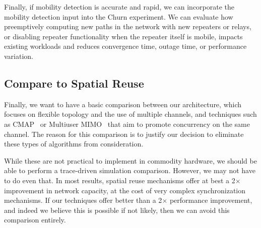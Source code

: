  Finally, if mobility detection is accurate and rapid, we can incorporate the mobility detection input into the Churn experiment. We can evaluate how preemptively computing new paths in the network with new repeaters or relays, or disabling repeater functionality when the repeater itself is mobile, impacts existing workloads and reduces convergence time, outage time, or performance variation.


\subsection{Compare to Spatial Reuse}
Finally, we want to have a basic comparison between our architecture, which focuses on flexible topology and the use of multiple channels, and techniques such as CMAP~\cite{vutukuru_cmap} or Multiuser MIMO~\cite{heath_mumimo,spencer_mumimo} that aim to promote concurrency on the same channel. The reason for this comparison is to justify our decision to eliminate these types of algorithms from consideration.

While these are not practical to implement in commodity hardware, we should be able to perform a trace-driven simulation comparison. However, we may not have to do even that. In most results, spatial reuse mechanisms offer at best a 2$\times$ improvement in network capacity, at the cost of very complex synchronization mechanisms. If our techniques offer better than a 2$\times$ performance improvement, and indeed we believe this is possible if not likely, then we can avoid this comparison entirely.
